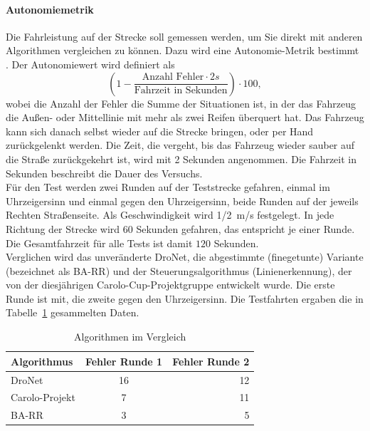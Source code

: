 \paragraph{Autonomiemetrik}
Die Fahrleistung auf der Strecke soll gemessen werden, um Sie direkt mit anderen Algorithmen vergleichen zu können. Dazu wird eine Autonomie-Metrik bestimmt \cite{bojarski2016end}. Der Autonomiewert wird definiert als 
\begin{equation}
\label{mat:autonomie}
(1 -  \frac{\text{Anzahl Fehler}\cdot 2 s}{\text{Fahrzeit in Sekunden}})\cdot 100,
\end{equation}
wobei die Anzahl der Fehler die Summe der Situationen ist, in der das Fahrzeug die Außen- oder Mittellinie mit mehr als zwei Reifen überquert hat. Das Fahrzeug kann sich danach selbst wieder auf die Strecke bringen, oder per Hand zurückgelenkt werden. Die Zeit, die vergeht, bis das Fahrzeug wieder sauber auf die Straße zurückgekehrt ist, wird mit 2 Sekunden angenommen. Die Fahrzeit in Sekunden beschreibt die Dauer des Versuchs.\\
Für den Test werden zwei Runden auf der Teststrecke gefahren, einmal im Uhrzeigersinn und einmal gegen den Uhrzeigersinn, beide Runden auf der jeweils Rechten Straßenseite. Als Geschwindigkeit wird \SI{1/2}{\meter/\second} festgelegt. In jede Richtung der Strecke wird $60$ Sekunden gefahren, das entspricht je einer Runde. Die Gesamtfahrzeit für alle Tests ist damit $120$ Sekunden.\\
Verglichen wird das unveränderte DroNet, die abgestimmte (finegetunte) Variante (bezeichnet als BA-RR) und der Steuerungsalgorithmus (Linienerkennung), der von der diesjährigen Carolo-Cup-Projektgruppe entwickelt wurde. Die erste Runde ist mit, die zweite gegen den Uhrzeigersinn. Die Testfahrten ergaben die in Tabelle~\ref{tab:testfahrten} gesammelten Daten.



\begin{table}[h]
  \begin{center}
    \caption{Algorithmen im Vergleich}
    \label{tab:testfahrten}
    \begin{tabular}{l|c|r} %
      \textbf{Algorithmus} & \textbf{Fehler Runde 1} & \textbf{Fehler Runde 2}\\
      \hline
      DroNet & 16 & 12\\
      Carolo-Projekt & 7 & 11\\
       BA-RR& 3 & 5\\
    \end{tabular}
  \end{center}
\end{table}

